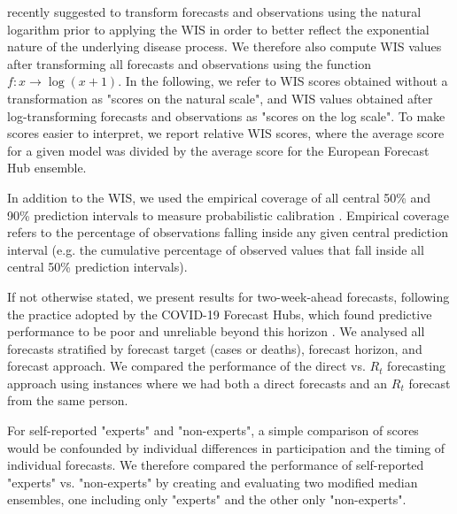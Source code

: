 \documentclass[10pt,a4paper,twocolumn]{article}
\begin{document}
\citet{bosseTransformationForecastsEvaluating2023} recently suggested to transform forecasts and observations using the natural logarithm prior to applying the WIS in order to better reflect the exponential nature of the underlying disease process. We therefore also compute WIS values after transforming all forecasts and observations using the function $f\colon x \to \log (x + 1)$. In the following, we refer to WIS scores obtained without a transformation as "scores on the natural scale", and WIS values obtained after log-transforming forecasts and observations as "scores on the log scale". To make scores easier to interpret, we report relative WIS scores, where the average score for a given model was divided by the average score for the European Forecast Hub ensemble. 

In addition to the WIS, we used the empirical coverage of all central 50\% and 90\% prediction intervals to measure probabilistic calibration \citep{gneitingProbabilisticForecastsCalibration2007}. Empirical coverage refers to the percentage of observations falling inside any given central prediction interval (e.g. the cumulative percentage of observed values that fall inside all central 50\% prediction intervals). 

If not otherwise stated, we present results for two-week-ahead forecasts, following the practice adopted by the COVID-19 Forecast Hubs, which found predictive performance to be poor and unreliable beyond this horizon \cite{cramerEvaluationIndividualEnsemble2021, sherrattPredictivePerformanceMultimodel2022a, bracherShorttermForecastingCOVID192021}. We analysed all forecasts stratified by forecast target (cases or deaths), forecast horizon, and forecast approach. We compared the performance of the direct vs. $R_t$ forecasting approach using instances where we had both a direct forecasts and an $R_t$ forecast from the same person. 

For self-reported "experts" and "non-experts", a simple comparison of scores would be confounded by individual differences in participation and the timing of individual forecasts. We therefore compared the performance of self-reported "experts" vs. "non-experts" by creating and evaluating two modified median ensembles, one including only "experts" and the other only "non-experts".

\end{document}
